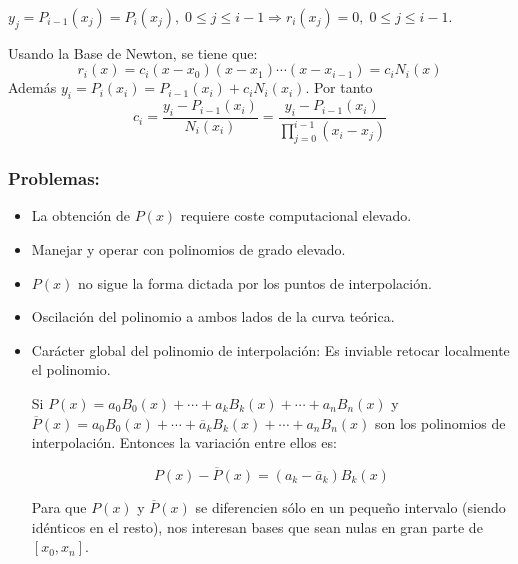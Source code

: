 \documentclass[twoside]{report}
\newcommand{\colocapdf}[2]{\quad\pdfimage width #2 {pdfs/#1.pdf}}
\begin{document}
\vspace{0.3cm}

$y_j=P_{i-1}(x_j)=P_i(x_j), \; 0\leq j\leq i-1 \Rightarrow r_i(x_j)=0,\; 0\leq j\leq i-1.$

Usando la Base de Newton, se tiene que:
$$r_i(x)=c_i(x-x_0)(x-x_1)\cdots (x-x_{i-1})=c_iN_i(x)$$
Además $y_i=P_i(x_i)=P_{i-1}(x_i)+c_i N_i(x_i).$ Por tanto
$$c_i=\frac{y_i-P_{i-1}(x_i)}{N_i(x_i)}=\frac{y_i-P_{i-1}(x_i)}{\prod_{j=0}^{i-1} (x_i-x_j)}$$

\subsubsection{Problemas:}

\begin{itemize}
\item La obtención de $P(x)$ requiere coste computacional elevado.
\item Manejar y operar con polinomios de grado elevado.
\item $P(x)$ no sigue la forma dictada por los puntos de interpolación.


\item Oscilación del polinomio a ambos lados de la curva teórica.

\item Carácter global del polinomio de interpolación: Es inviable retocar localmente el polinomio.


Si $P(x)= a_0 B_0(x)+\cdots+a_kB_k(x)+\cdots +a_n B_n(x)$ y $\overline{P}(x)= a_0 B_0(x)+\cdots+\overline{a}_kB_k(x)+\cdots +a_n B_n(x)$ son los polinomios de interpolación. Entonces la variación entre ellos es:

$$P(x)-\overline{P}(x)= (a_k-\overline{a}_k) B_k(x)$$

Para que $P(x)$ y $\overline{P}(x)$ se diferencien sólo en un pequeño intervalo (siendo idénticos en el resto), nos interesan bases que sean nulas en gran parte de $[x_0,x_n]$.
\end{itemize}
\end{document}
